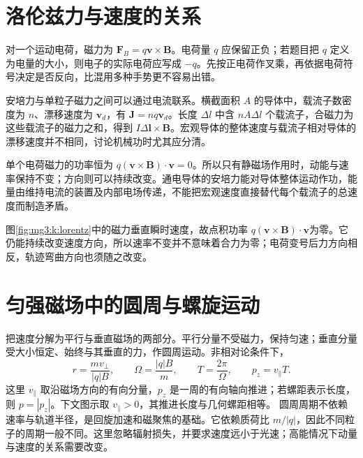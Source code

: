 \section{洛伦兹力与速度的关系}
对一个运动电荷，磁力为 $\bm F_B=q\bm v\times\bm B$。电荷量 $q$ 应保留正负；若题目把 $q$ 定义为电量的大小，则电子的实际电荷应写成 $-q$。先按正电荷作叉乘，再依据电荷符号决定是否反向，比混用多种手势更不容易出错。


安培力与单粒子磁力之间可以通过电流联系。横截面积 $A$ 的导体中，载流子数密度为 $n$、漂移速度为 $\bm v_d$，有 $\bm J=nq\bm v_d$。长度 $\Delta l$ 中含 $nA\Delta l$ 个载流子，合磁力为这些载流子的磁力之和，得到 $I\Delta\bm l\times\bm B$。宏观导体的整体速度与载流子相对导体的漂移速度并不相同，讨论机械功时尤其应分清。


单个电荷磁力的功率恒为 $q(\bm v\times\bm B)\cdot\bm v=0$。所以只有静磁场作用时，动能与速率保持不变；方向则可以持续改变。通电导体的安培力能对导体整体运动作功，能量由维持电流的装置及内部电场传递，不能把宏观速度直接替代每个载流子的总速度而制造矛盾。


图\ref{fig:mg3:k:lorentz}中的磁力垂直瞬时速度，故点积功率 $q(\bm v\times\bm B)\cdot\bm v$为零。它仍能持续改变速度方向，所以速率不变并不意味着合力为零；电荷变号后力方向相反，轨迹弯曲方向也须随之改变。


\section{匀强磁场中的圆周与螺旋运动}
把速度分解为平行与垂直磁场的两部分。平行分量不受磁力，保持匀速；垂直分量受大小恒定、始终与其垂直的力，作圆周运动。非相对论条件下，
\begin{equation}r=\frac{mv_\perp}{|q|B},\qquad
\Omega=\frac{|q|B}{m},\qquad T=\frac{2\pi}{\Omega},\qquad
p_z=v_\parallel T.\end{equation}
这里 $v_\parallel$ 取沿磁场方向的有向分量，$p_z$ 是一周的有向轴向推进；若螺距表示长度，则 $p=|p_z|$。下文图示取 $v_\parallel>0$，其推进长度与几何螺距相等。
圆周周期不依赖速率与轨道半径，是回旋加速和磁聚焦的基础。它依赖质荷比 $m/|q|$，因此不同粒子的周期一般不同。这里忽略辐射损失，并要求速度远小于光速；高能情况下动量与速度的关系需要改变。


